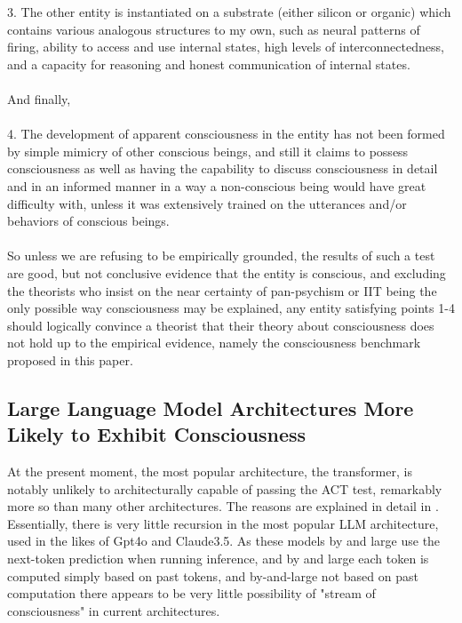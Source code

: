 \documentclass{article}
\begin{document}
3. The other entity is instantiated on a substrate (either silicon or organic) which contains various analogous structures to my own, such as neural patterns of firing, ability to access and use internal states, high levels of interconnectedness, and a capacity for reasoning and honest communication of internal states.\\ \\
And finally,\\ \\
4. The development of apparent consciousness in the entity has not been formed by simple mimicry of other conscious beings, and still it claims to possess consciousness as well as having the capability to discuss consciousness in detail and in an informed manner in a way a non-conscious being would have great difficulty with, unless it was extensively trained on the utterances and/or behaviors of conscious beings.\\ \\ 
So unless we are refusing to be empirically grounded, the results of such a test are good, but not conclusive evidence that the entity is conscious, and excluding the theorists who insist on the near certainty of pan-psychism or IIT being the only possible way consciousness may be explained, any entity satisfying points 1-4 should logically convince a theorist that their theory about consciousness does not hold up to the empirical evidence, namely the consciousness benchmark proposed in this paper.
\subsection{Large Language Model Architectures More Likely to Exhibit Consciousness}
At the present moment, the most popular architecture, the transformer, is notably unlikely to architecturally capable of passing the ACT test, remarkably more so than many other architectures. The reasons are explained in detail in \citep{butlin2023consciousnessartificialintelligenceinsights}. Essentially, there is very little recursion in the most popular LLM architecture, used in the likes of Gpt4o and Claude3.5. As these models by and large use the next-token prediction when running inference, and by and large each token is computed simply based on past tokens, and by-and-large not based on past computation there appears to be very little possibility of "stream of consciousness" in current architectures.
\end{document}
